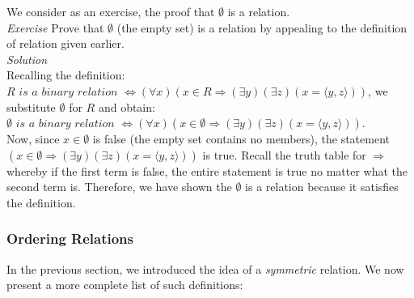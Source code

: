 We consider as an exercise, the proof that $\emptyset$ is a relation.\\

\textit{Exercise} Prove that $\emptyset$ (the empty set) is a relation by appealing to the definition of relation given earlier.\\
\textit{Solution}\\
Recalling the definition: $R \textit{ is a binary relation } \Longleftrightarrow (\forall x) (x \in R \Longrightarrow (\exists y)(\exists z)(x=\langle y,z \rangle))$, we substitute $\emptyset$ for $R$ and obtain:\\

$\emptyset \textit{ is a binary relation } \Longleftrightarrow (\forall x) (x \in \emptyset \Longrightarrow (\exists y)(\exists z)(x=\langle y,z \rangle))$.\\

Now, since $x \in \emptyset$ is false (the empty set contains no members), the statement $(x \in \emptyset \Longrightarrow (\exists y)(\exists z)(x=\langle y,z \rangle))$ is true.  Recall the truth table for $\Longrightarrow$ whereby if the first term is false, the entire statement is true no matter what the second term is.  Therefore, we have shown the $\emptyset$ is a relation because it satisfies the definition.\\

\subsubsection{Ordering Relations}

In the previous section, we introduced the idea of a \textit{symmetric} relation.  We now present a more complete list of such definitions:

